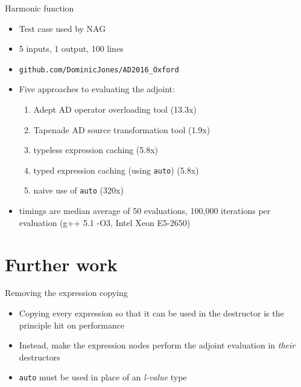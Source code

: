 \documentclass[xcolor=dvipsnames]{beamer}
\begin{document}
\begin{frame}[fragile]{Harmonic function}
\begin{itemize}
\item Test case used by NAG \vspace{5mm}
\item 5 inputs, 1 output, 100 lines \vspace{5mm}
\item \verb|github.com/DominicJones/AD2016_Oxford| \vspace{5mm}
\item Five approaches to evaluating the adjoint: \vspace{2mm}
  \begin{enumerate}
  \item Adept AD operator overloading tool (13.3x) \vspace{2mm}
  \item Tapenade AD source transformation tool (1.9x) \vspace{2mm}
  \item {\color{blue}typeless expression caching (5.8x)} \vspace{2mm}
  \item {\color{blue}typed expression caching (using \texttt{auto}) (5.8x)} \vspace{2mm}
  \item {\color{red}naive use of \texttt{auto} (320x)} \vspace{2mm}
\end{enumerate}
\item timings are median average of 50 evaluations, 100,000 iterations per evaluation (g++ 5.1 -O3, Intel Xeon E5-2650)
\end{itemize}
\end{frame}




\section{Further work}


\begin{frame}[fragile]{Removing the expression copying}
\begin{itemize}
\item Copying every expression so that it can be used in the destructor is the principle hit on performance \vspace{5mm}
\item Instead, make the expression nodes perform the adjoint evaluation in \emph{their} destructors \vspace{5mm}
\item \texttt{auto} must be used in place of an \emph{l-value} type \vspace{5mm}
\end{itemize}
\end{frame}
\end{document}
